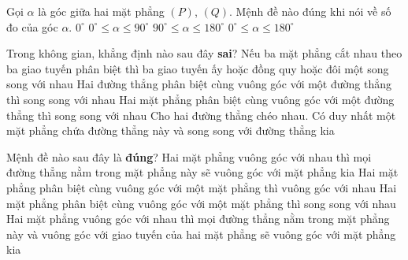 

\begin{ex}%
	Gọi $\alpha$ là góc giữa hai mặt phẳng $(P)$, $(Q)$. Mệnh đề nào đúng khi nói về  số đo của góc $\alpha$.
	 \choice
		 {$0^\circ$}
		{\True $0^\circ\le\alpha\le  90^\circ$}
		 {$90^\circ\le\alpha\le 180^\circ$}
		{$0^\circ\le\alpha\le 180^\circ$} 
\end{ex}

\begin{ex}%
	Trong không gian,  khẳng định nào sau đây \textbf{sai}?
	 \choice
		{Nếu ba mặt phẳng cắt nhau theo ba giao tuyến phân biệt thì ba giao tuyến ấy hoặc đồng  quy hoặc đôi một song song với nhau}
		{\True Hai đường thẳng phân biệt cùng vuông góc với một đường thẳng thì song song  với nhau}
		{Hai mặt phẳng phân biệt cùng vuông góc với một đường thẳng thì song song với nhau} 
		{Cho hai đường thẳng  chéo nhau. Có duy nhất một mặt phẳng chứa đường thẳng này và song song với đường thẳng kia}
\end{ex}

\begin{ex}%
	Mệnh đề nào sau đây  là \textbf{đúng}?
	\choice 
		{Hai mặt phẳng vuông góc với nhau  thì mọi đường thẳng nằm trong mặt phẳng này sẽ vuông góc với mặt phẳng kia}
		{Hai mặt phẳng phân biệt cùng vuông góc  với một mặt phẳng thì vuông góc với nhau}
		{Hai mặt phẳng phân biệt cùng vuông góc  với một mặt phẳng thì song song với nhau}
		{\True Hai mặt phẳng vuông góc với nhau thì mọi đường thẳng nằm trong mặt phẳng này và vuông góc với giao tuyến của hai mặt phẳng sẽ  vuông góc với mặt phẳng kia}
\end{ex}

